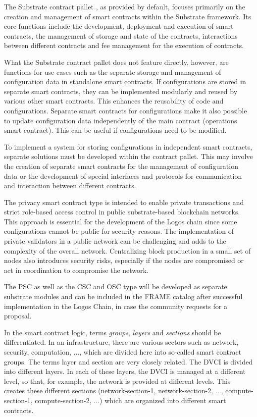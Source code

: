 \documentclass[]{article}
\begin{document}
The Substrate contract pallet \cite{Parity-docs-npos}, as provided by default, focuses primarily on the creation and management of smart contracts within the Substrate framework. 
Its core functions include the development, deployment and execution of smart contracts, the management of storage and state of the contracts, interactions between different contracts and fee management for the execution of contracts. 

What the Substrate contract pallet does not feature directly, however, are functions for use cases such as the separate storage and management of configuration data in standalone smart contracts.
If configurations are stored in separate smart contracts, they can be implemented modularly and reused by various other smart contracts. This enhances the reusability of code and configurations.
Separate smart contracts for configurations make it also possible to update configuration data independently of the main contract (operations smart contract). 
This can be useful if configurations need to be modified.

To implement a system for storing configurations in independent smart contracts, separate solutions must be developed within the contract pallet. 
This may involve the creation of separate smart contracts for the management of configuration data or the development of special interfaces and protocols for communication and interaction between different contracts.

The privacy smart contract type is intended to enable private transactions and strict role-based access control in public substrate-based blockchain networks.
This approach is essential for the development of the Logos chain since some configurations cannot be public for security reasons.
The implementation of private validators in a public network can be challenging and adds to the complexity of the overall network.
Centralizing block production in a small set of nodes also introduces security risks, especially if the nodes are compromised or act in coordination to compromise the network.

The PSC as well as the CSC and OSC type will be developed as separate substrate modules and can be included in the FRAME catalog after successful implementation in the Logos Chain, in case the community requests for a proposal.  

In the smart contract logic, terms \textit{groups}, \textit{layers} and \textit{sections} should be differentiated.
In an infrastructure, there are various sectors such as network, security, computation, ..., which are divided here into so-called smart contract groups.
The terms layer and section are very closely related. 
The DVCI is divided into different layers. 
In each of these layers, the DVCI is managed at a different level, so that, for example, the network is provided at different levels.
This creates these different sections (network-section-1, network-section-2, ..., compute-section-1, compute-section-2, ...) which are organized into different smart contracts.
\end{document}
